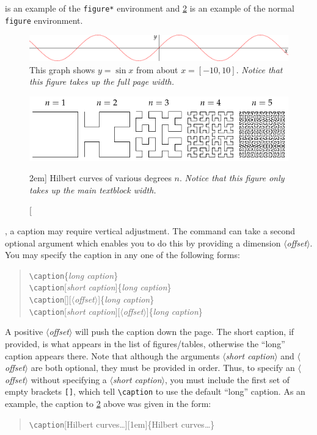 \documentclass[a4paper]{tufte-handout}
\newcommand{\hlorange}[1]{\textcolor{tufte-orange}{#1}}
\newcommand{\doccmd}[1]{\hlorange{\texttt{\textbackslash#1}}}
\newcommand{\docopt}[1]{\( \langle \)\textrm{\textit{#1}}\( \rangle \)}
\newcommand{\docarg}[1]{\textrm{\textit{#1}}}
\newcommand{\docenv}[1]{\hlorange{\texttt{#1}}}
\newenvironment{docspec}
  {\begin{quotation}\ttfamily\parskip0pt\parindent0pt\ignorespaces}
  {\end{quotation}}
\begin{document}
\pagebreak
{} is an example of the \docenv{figure*} environment and \cref{fig:textfig} is an example of the normal
\docenv{figure} environment.

\begin{figure}[h]
  \includegraphics[width=\linewidth]{sine.pdf}%
  \caption[Sine graph showcasing full width figure environment]{%
    This graph shows \(y = \sin x\) from about \(x = [-10, 10]\).
    \emph{Notice that this figure takes up the full page width.}
  }\label{fig:fullfig}
\end{figure}

\begin{figure}
  \includegraphics{hilbert-curves.pdf}
  \caption[Hilbert curves of various degrees \(n\)][2em]{%
    Hilbert curves of various degrees \(n\).
    \emph{Notice that this figure only takes up the main textblock width.}
  }\label{fig:textfig}
\end{figure}

, a caption may require vertical adjustment. 
The  command can take a second optional argument which enables you to do this by providing a dimension \docopt{offset}.
You may specify the caption in any one of the following forms:
\begin{docspec}
  \doccmd{caption}\{\docarg{long caption}\} \\
  \doccmd{caption}[\docarg{short caption}]\{\docarg{long caption}\} \\
  \doccmd{caption}[][\docopt{offset}]\{\docarg{long caption}\} \\
  \doccmd{caption}[\docarg{short caption}][\docopt{offset}]\{\docarg{long caption}\}
\end{docspec}
A positive \docopt{offset} will push the caption down the page.
The short caption, if provided, is what appears in the list of figures/tables, otherwise the ``long'' caption appears there.
Note that although the arguments \docopt{short caption} and \docopt{offset} are both optional, they must be provided in order. 
Thus, to specify an \docopt{offset} without specifying a \docopt{short caption}, you must include the first set of empty brackets \Verb|[]|, which tell \doccmd{caption} to use the default ``long'' caption. 
As an example, the caption to \cref{fig:textfig} above was given in the form:
\begin{docspec}
  \doccmd{caption}[Hilbert curves\ldots][1em]\{Hilbert curves\ldots{}\}
\end{docspec}
\end{document}
